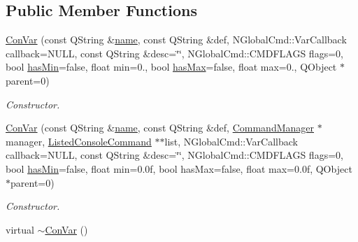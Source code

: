 \subsection*{Public Member Functions}
\begin{DoxyCompactItemize}
\item 
\hyperlink{class_con_var_ac437fec999dde2751271c7c1e400d89d}{Con\-Var} (const Q\-String \&\hyperlink{class_base_console_command_a2f21764f46a3864a362eae2e3396e363}{name}, const Q\-String \&def, N\-Global\-Cmd\-::\-Var\-Callback callback=N\-U\-L\-L, const Q\-String \&desc=\char`\"{}\char`\"{}, N\-Global\-Cmd\-::\-C\-M\-D\-F\-L\-A\-G\-S flags=0, bool \hyperlink{class_con_var_a047d4105baf54cb783602456e0947196}{has\-Min}=false, float min=0., bool \hyperlink{class_con_var_ab8a0883ab2a53b5ef20ea5673636ac01}{has\-Max}=false, float max=0., Q\-Object $\ast$parent=0)
\begin{DoxyCompactList}\small\item\em Constructor. \end{DoxyCompactList}\item 
\hyperlink{class_con_var_a6755a812d1e97a6524c26a703e480359}{Con\-Var} (const Q\-String \&\hyperlink{class_base_console_command_a2f21764f46a3864a362eae2e3396e363}{name}, const Q\-String \&def, \hyperlink{class_command_manager}{Command\-Manager} $\ast$manager, \hyperlink{class_listed_console_command}{Listed\-Console\-Command} $\ast$$\ast$list, N\-Global\-Cmd\-::\-Var\-Callback callback=N\-U\-L\-L, const Q\-String \&desc=\char`\"{}\char`\"{}, N\-Global\-Cmd\-::\-C\-M\-D\-F\-L\-A\-G\-S flags=0, bool \hyperlink{class_con_var_a047d4105baf54cb783602456e0947196}{has\-Min}=false, float min=0.\-0f, bool has\-Max=false, float max=0.\-0f, Q\-Object $\ast$parent=0)
\begin{DoxyCompactList}\small\item\em Constructor. \end{DoxyCompactList}\item 
\hypertarget{class_con_var_ae903ce87b0937b4fe2e1c731783370ff}{virtual \hyperlink{class_con_var_ae903ce87b0937b4fe2e1c731783370ff}{$\sim$\-Con\-Var} ()}\label{class_con_var_ae903ce87b0937b4fe2e1c731783370ff}


\end{DoxyCompactItemize}
